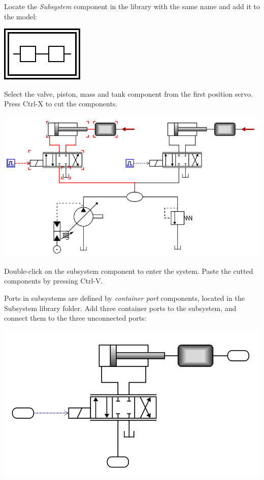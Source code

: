 \documentclass[a4paper,pdftex]{article}
\begin{document}
\begin{tutenumerate}
Locate the \textit{Subsystem} component in the library with the same name and add it to the model:

\vspace{5pt}
\includegraphics{gfx/advancedusage/subsystem.pdf}

Select the valve, piston, mass and tank component from the first position servo. Press Ctrl-X to cut the components.

\includegraphics[width=0.85\linewidth]{gfx/advancedusage/componentsforsubsystem.png}

Double-click on the subsystem component to enter the system. Paste the cutted components by pressing Ctrl-V.

Ports in subsystems are defined by \textit{container port} components, located in the Subsystem library folder. Add three container ports to the subsystem, and connect them to the three unconnected ports:

\includegraphics[width=0.6\linewidth]{gfx/advancedusage/systemports.png}


\end{tutenumerate}
\end{document}
